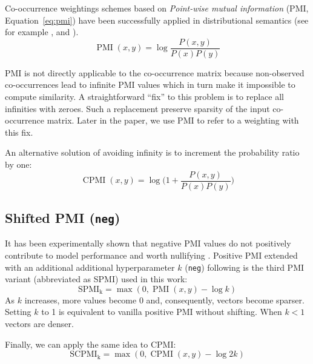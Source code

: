 \documentclass[11pt,letterpaper]{article}
\begin{document}
Co-occurrence weightings schemes based on \emph{Point-wise mutual information} (PMI, Equation~\ref{eq:pmi}) have been successfully applied in distributional semantics (see for example ,  and ).
%
\begin{equation}
  \label{eq:pmi}
  \operatorname{PMI}(x, y) = \log\frac{P(x,y)}{P(x)P(y)}
\end{equation}

PMI is not directly applicable to the co-occurrence matrix because non-observed co-occurrences lead to infinite PMI values which in turn make it impossible to compute similarity. A straightforward ``fix'' to this problem is to replace all infinities with zeroes. Such a replacement preserve sparsity of the input co-occurrence matrix. Later in the paper, we use PMI to refer to a weighting with this fix.

An alternative solution of avoiding infinity is to increment the probability ratio by one:
%
\begin{equation}
  \label{eq:cpmi}
  \operatorname{CPMI}(x, y) = \log\Big( 1 + \frac{P(x,y)}{P(x)P(y)} \Big)
\end{equation}

\subsection{Shifted PMI (\texttt{neg})}
\label{sec:shifted-pmi}

It has been experimentally shown that negative PMI values do not positively contribute to model performance and worth nullifying \cite{Turney:2010:FMV:1861751.1861756}. Positive PMI extended with an additional additional hyperparameter $k$ (\texttt{neg}) following  is the third PMI variant (abbreviated as SPMI) used in this work:
%
\begin{equation}
  \label{eq:ppmi}
  \operatorname{SPMI_k} = \max (0, \operatorname{PMI}(x, y) - \log k)
\end{equation}
%
As $k$ increases, more values become 0 and, consequently, vectors become sparser. Setting $k$ to 1 is equivalent to vanilla positive PMI without shifting. When $k < 1$ vectors are denser.

Finally, we can apply the same idea to CPMI:
%
\begin{equation}
  \label{eq:pcpmi}
  \operatorname{SCPMI_k} = \max (0, \operatorname{CPMI}(x, y) - \log 2k)
\end{equation}
\end{document}
